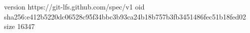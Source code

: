 version https://git-lfs.github.com/spec/v1
oid sha256:e412b5220dc06528c95f34bbc3b93ca24b18b757b3fb3451486fec51b18fed02
size 16347
